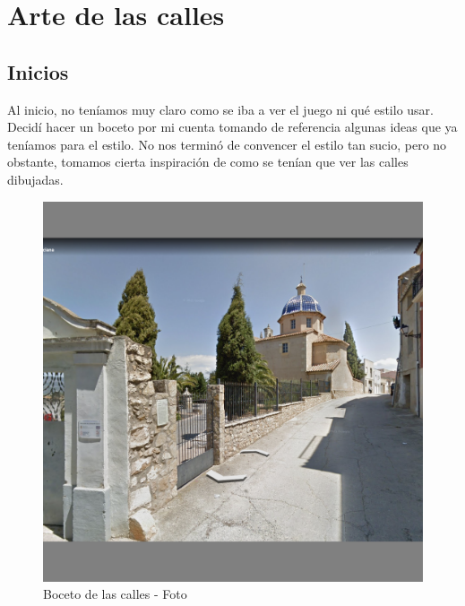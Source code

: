 \documentclass[12pt]{article}
\begin{document}
\newpage
\section{Arte de las calles}

    \subsection{Inicios}
        Al inicio, no teníamos muy claro como se iba a ver el juego ni qué estilo usar. Decidí hacer un boceto por mi cuenta tomando de referencia algunas ideas que ya teníamos para el estilo.
        No nos terminó de convencer el estilo tan sucio, pero no obstante, tomamos cierta inspiración de como se tenían que ver las calles dibujadas.

        \begin{figure}[H]
            \centering
            \begin{minipage}[b]{0.45\textwidth}
                \centering
                \includegraphics[width=\textwidth]{imgs/escenario_minijuego_foto.png}
                \caption{Boceto de las calles - Foto}
                \label{fig:calle_boceto_foto}
            \end{minipage}
            \hspace{0.05\textwidth}
            \begin{minipage}[b]{0.45\textwidth}

\end{minipage}
\end{figure}
\end{document}
